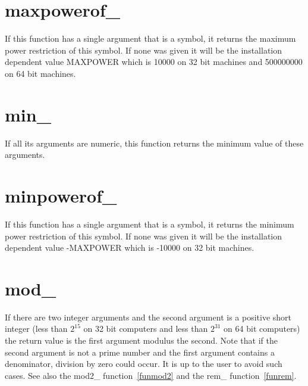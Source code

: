 
\section{maxpowerof\_}
\label{funmaxpowerof}
\noindent If this function has a single argument that is a symbol, it 
returns the maximum power restriction of this symbol. If none was given it 
will be the installation dependent value MAXPOWER which is 10000 on 
32 bit machines and 500000000 on 64 bit 
machines.


\section{min\_}
\label{funmin}
\noindent If all its arguments are numeric, this function returns 
the minimum value of these arguments.


\section{minpowerof\_}
\label{funminpowerof}
\noindent If this function has a single argument that is a symbol, it 
returns the minimum power restriction of this symbol. If none was given it 
will be the installation dependent value -MAXPOWER which is -10000 on 32 bit 
machines.


\section{mod\_}
\label{funmod}
\noindent If there are two integer arguments and the second 
argument is a positive short integer (less than $2^{15}$ on 32 bit 
computers and less than $2^{31}$ on 64 bit computers) the return value is 
the first argument modulus the second. Note that if the second argument is 
not a prime number and the first argument contains a denominator, division 
by zero could occur. It is up to the user to avoid such cases. See also the 
mod2\_ function~\ref{funmod2} and the rem\_ function~\ref{funrem}.


